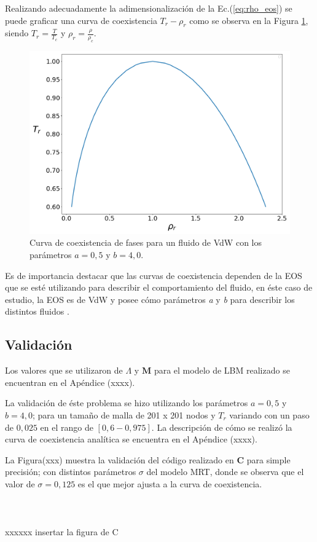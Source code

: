 Realizando adecuadamente la adimensionalización  de la Ec.(\ref{eq:rho_eos}) se puede graficar una curva de coexistencia $T_r - \rho_r$  como se observa en la Figura \ref{fig:T_r_rho_r_analitico}, siendo $T_r = \frac{T}{T_c}$ y $\rho_r = \frac{\rho}{\rho_c}$.

\begin{figure}[h!]
	\centering
	\includegraphics[width=.8\textwidth]{figs/cap4/Diagrama_T_r_vs_rho_r_analitico}
	\caption{Curva de coexistencia de fases para un fluido de VdW con los parámetros $a = 0,5 $ y $b = 4,0 $.}
	\label{fig:T_r_rho_r_analitico}	
\end{figure}

\newpage
Es de importancia destacar que las curvas de coexistencia dependen de la EOS que se esté utilizando para describir el comportamiento del fluido, en éste caso de estudio, la EOS es de VdW y posee  cómo parámetros \textit{a} y \textit{b} para describir los distintos fluidos .

\subsection{Validación}

Los valores que se utilizaron de $\Lambda$ y $\mathbf{M}$ para el modelo de LBM realizado se encuentran en el Apéndice (xxxx).

La validación de éste problema se hizo utilizando los parámetros $a =0,5$ y $b = 4,0$; para un tamaño de malla de 201 x 201 nodos y $T_r$ variando con un paso de $0,025$ en el rango de $[0,6 - 0,975]$. La descripción de cómo se realizó la curva de coexistencia analítica se encuentra en el Apéndice (xxxx).

La Figura(xxx) muestra la validación del código realizado en \textbf{C} para simple precisión; con distintos parámetros $\sigma$ del modelo MRT, donde se observa que el valor de $\sigma = 0,125$ es el que mejor ajusta a la curva de coexistencia.
\\
\\
\\
\\
xxxxxx insertar la figura de C
\\
\\
\\
\\

